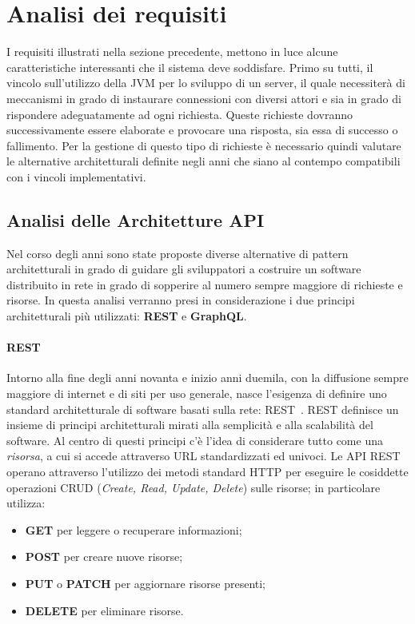 \section{Analisi dei requisiti}
I requisiti illustrati nella sezione precedente, mettono in luce alcune caratteristiche interessanti che il sistema deve soddisfare. Primo su tutti,
il vincolo sull'utilizzo della \ac{JVM} per lo sviluppo di un server, il quale necessiterà di meccanismi in grado di instaurare connessioni
con diversi attori e sia in grado di rispondere adeguatamente ad ogni richiesta. Queste richieste dovranno successivamente essere elaborate e provocare
una risposta, sia essa di successo o fallimento. Per la gestione di questo tipo di richieste è necessario quindi valutare le alternative architetturali
definite negli anni che siano al contempo compatibili con i vincoli implementativi.

\subsection{Analisi delle Architetture API}\label{ssec:api-analysis}
Nel corso degli anni sono state proposte diverse alternative di pattern architetturali in grado di guidare gli sviluppatori a costruire un software
distribuito in rete in grado di sopperire al numero sempre maggiore di richieste e risorse.
In questa analisi verranno presi in considerazione i due principi architetturali più utilizzati: \textbf{REST} e \textbf{GraphQL}.

\paragraph{REST}\label{par:rest}
Intorno alla fine degli anni novanta e inizio anni duemila, con la diffusione sempre maggiore di internet e di siti per uso generale, nasce l'esigenza
di definire uno standard architetturale di software basati sulla rete: \ac{REST}~\cite{rest}. \ac{REST} definisce un insieme di principi architetturali
mirati alla semplicità e alla scalabilità del software. Al centro di questi principi c'è l'idea di considerare tutto come una \textit{risorsa}, a cui si
accede attraverso URL standardizzati ed univoci.
Le API \ac{REST} operano attraverso l'utilizzo dei metodi standard HTTP per eseguire le cosiddette operazioni CRUD (\textit{Create, Read, Update, Delete}) sulle risorse; in particolare utilizza:
\begin{itemize}
    \item \textbf{GET} per leggere o recuperare informazioni;
    \item \textbf{POST} per creare nuove risorse;
    \item \textbf{PUT} o \textbf{PATCH} per aggiornare risorse presenti;
    \item \textbf{DELETE} per eliminare risorse.
\end{itemize}

